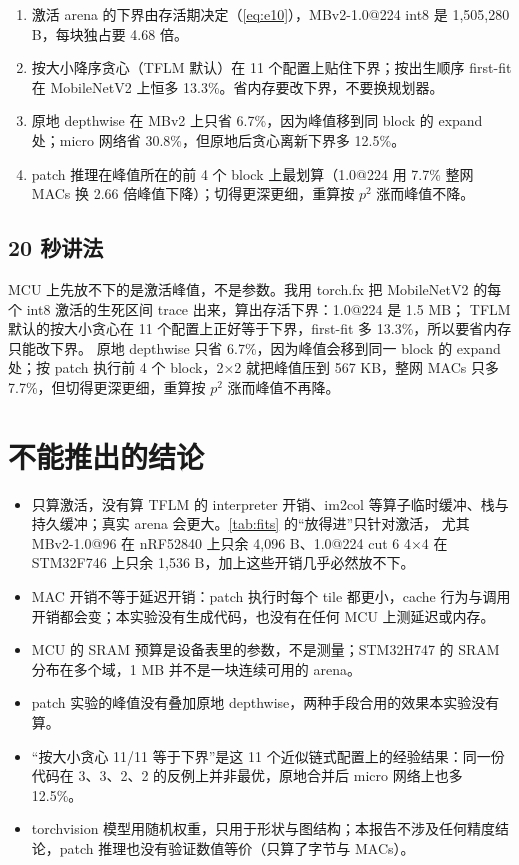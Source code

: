 \documentclass[11pt,a4paper]{ctexart}
\begin{document}
\begin{findingbox}[：四句话]
\begin{enumerate}
  \item 激活 arena 的下界由存活期决定（\cref{eq:e10}），MBv2-1.0@224 int8 是 1,505,280 B，每块独占要 4.68 倍。
  \item 按大小降序贪心（TFLM 默认）在 11 个配置上贴住下界；按出生顺序 first-fit 在 MobileNetV2 上恒多 13.3\%。省内存要改下界，不要换规划器。
  \item 原地 depthwise 在 MBv2 上只省 6.7\%，因为峰值移到同 block 的 expand 处；micro 网络省 30.8\%，但原地后贪心离新下界多 12.5\%。
  \item patch 推理在峰值所在的前 4 个 block 上最划算（1.0@224 用 7.7\% 整网 MACs 换 2.66 倍峰值下降）；切得更深更细，重算按 $p^2$ 涨而峰值不降。
\end{enumerate}
\end{findingbox}

\subsection*{20 秒讲法}
MCU 上先放不下的是激活峰值，不是参数。我用 torch.fx 把 MobileNetV2 的每个 int8 激活的生死区间 trace 出来，算出存活下界：1.0@224 是 1.5 MB；
TFLM 默认的按大小贪心在 11 个配置上正好等于下界，first-fit 多 13.3\%，所以要省内存只能改下界。
原地 depthwise 只省 6.7\%，因为峰值会移到同一 block 的 expand 处；按 patch 执行前 4 个 block，2×2 就把峰值压到 567 KB，整网 MACs 只多 7.7\%，但切得更深更细，重算按 $p^2$ 涨而峰值不再降。

\section{不能推出的结论}\label{sec:caveat}

\begin{caveatbox}
\begin{itemize}
  \item 只算激活，没有算 TFLM 的 interpreter 开销、im2col 等算子临时缓冲、栈与持久缓冲；真实 arena 会更大。\cref{tab:fits} 的“放得进”只针对激活，
        尤其 MBv2-1.0@96 在 nRF52840 上只余 4,096 B、1.0@224 cut 6 4×4 在 STM32F746 上只余 1,536 B，加上这些开销几乎必然放不下。
  \item MAC 开销不等于延迟开销：patch 执行时每个 tile 都更小，cache 行为与调用开销都会变；本实验没有生成代码，也没有在任何 MCU 上测延迟或内存。
  \item MCU 的 SRAM 预算是设备表里的参数，不是测量；STM32H747 的 SRAM 分布在多个域，1 MB 并不是一块连续可用的 arena。
  \item patch 实验的峰值没有叠加原地 depthwise，两种手段合用的效果本实验没有算。
  \item “按大小贪心 11/11 等于下界”是这 11 个近似链式配置上的经验结果：同一份代码在 3、3、2、2 的反例上并非最优，原地合并后 micro 网络上也多 12.5\%。
  \item torchvision 模型用随机权重，只用于形状与图结构；本报告不涉及任何精度结论，patch 推理也没有验证数值等价（只算了字节与 MACs）。
\end{itemize}
\end{caveatbox}
\end{document}
